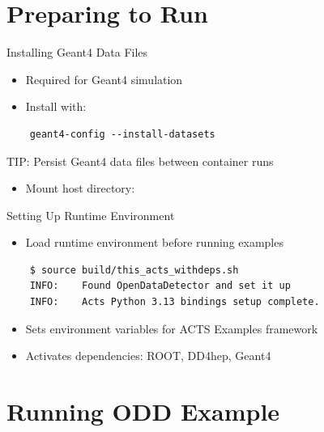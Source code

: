 \documentclass[lualatex,aspectratio=169,t,13pt,dvipsnames]{beamer}
\begin{document}
\section{Preparing to Run}
\begin{frame}[fragile,c]{Installing Geant4 Data Files}
  \begin{itemize}
    \item Required for Geant4 simulation
    \item Install with:
  \end{itemize}
  
  \begin{verbatim}
    geant4-config --install-datasets
  \end{verbatim}
  
  \begin{successblock}{ TIP: Persist Geant4 data files between container runs}
  \begin{itemize}
      \item Mount host directory: 
  \end{itemize}
  \end{successblock}
\end{frame}

\begin{frame}[fragile,c]{Setting Up Runtime Environment}
  \begin{itemize}
    \item Load runtime environment before running examples
  \end{itemize}
  
  \begin{verbatim}
    $ source build/this_acts_withdeps.sh
    INFO:    Found OpenDataDetector and set it up
    INFO:    Acts Python 3.13 bindings setup complete.
  \end{verbatim}
  
  \begin{itemize}
    \item Sets environment variables for ACTS Examples framework
    \item Activates dependencies: ROOT, DD4hep, Geant4
  \end{itemize}
\end{frame}

\section{Running ODD Example}
\end{document}
